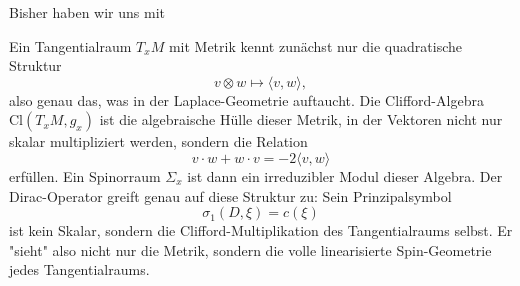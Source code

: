 






Bisher haben wir uns mit 








Ein Tangentialraum $T_x M$ mit Metrik kennt zunächst nur die quadratische Struktur
$$
v \otimes w \mapsto\langle v, w\rangle,
$$
also genau das, was in der Laplace-Geometrie auftaucht. Die Clifford-Algebra $\mathrm{Cl}\left(T_x M, g_x\right)$ ist die algebraische Hülle dieser Metrik, in der Vektoren nicht nur skalar multipliziert werden, sondern die Relation
$$
v \cdot w+w \cdot v=-2\langle v, w\rangle
$$
erfüllen. Ein Spinorraum $\Sigma_x$ ist dann ein irreduzibler Modul dieser Algebra. Der Dirac-Operator greift genau auf diese Struktur zu: Sein Prinzipalsymbol
$$
\sigma_1(D, \xi)=c(\xi)
$$
ist kein Skalar, sondern die Clifford-Multiplikation des Tangentialraums selbst.
Er "sieht" also nicht nur die Metrik, sondern die volle linearisierte Spin-Geometrie jedes Tangentialraums.